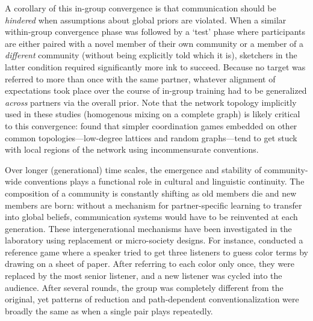 A corollary of this in-group convergence is that communication should be \emph{hindered} when assumptions about global priors are violated. When a similar within-group convergence phase was followed by a `test' phase where participants are either paired with a novel member of their own community or a member of a \emph{different} community (without being explicitly told which it is), sketchers in the latter condition required significantly more ink to succeed. %
Because no target was referred to more than once with the same partner, whatever alignment of expectations took place over the course of in-group training had to be generalized \emph{across} partners via the overall prior. Note that the network topology implicitly used in these studies (homogenous mixing on a complete graph) is likely critical to this convergence:  found that  simpler coordination games embedded on other common topologies---low-degree lattices and random graphs---tend to get stuck with local regions of the network using incommensurate conventions. 

Over longer (generational) time scales, the emergence and stability of community-wide conventions plays a functional role in cultural and linguistic continuity. The composition of a community is constantly shifting as old members die and new members are born: without a mechanism for partner-specific learning to transfer into global beliefs, communication systems would have to be reinvented at each generation. These intergenerational mechanisms have been investigated in the laboratory using replacement or micro-society designs.%
For instance,  conducted a reference game where a speaker tried to get three listeners to guess color terms by drawing on a sheet of paper. After referring to each color only once, they were replaced by the most senior listener, and a new listener was cycled into the audience. After several rounds, the group was completely different from the original, yet patterns of reduction and path-dependent conventionalization were broadly the same as when a single pair plays repeatedly. 

